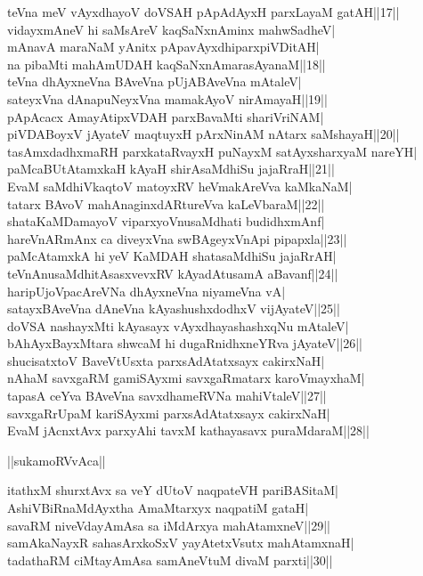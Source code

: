 \documentclass{article}
\begin{document}
teVna meV vAyxdhayoV doVSAH pApAdAyxH parxLayaM gatAH||17||\\
vidayxmAneV hi saMsAreV kaqSaNxnAminx mahwSadheV|\\
mAnavA maraNaM yAnitx pApavAyxdhiparxpiVDitAH|\\
na pibaMti mahAmUDAH kaqSaNxnAmarasAyanaM||18||\\
teVna dhAyxneVna BAveVna pUjABAveVna mAtaleV|\\
sateyxVna dAnapuNeyxVna mamakAyoV nirAmayaH||19||\\
pApAcacx AmayAtipxVDAH parxBavaMti shariVriNAM|\\
piVDABoyxV jAyateV maqtuyxH pArxNinAM nAtarx saMshayaH||20||\\
tasAmxdadhxmaRH parxkataRvayxH puNayxM satAyxsharxyaM nareYH|\\
paMcaBUtAtamxkaH kAyaH shirAsaMdhiSu jajaRraH||21||\\
EvaM saMdhiVkaqtoV matoyxRV heVmakAreVva kaMkaNaM|\\
tatarx BAvoV mahAnaginxdARtureVva kaLeVbaraM||22||\\
shataKaMDamayoV viparxyoVnusaMdhati budidhxmAnf|\\
hareVnARmAnx ca diveyxVna swBAgeyxVnApi pipapxla||23||\\
paMcAtamxkA hi yeV KaMDAH shatasaMdhiSu jajaRrAH|\\
teVnAnusaMdhitAsasxvevxRV kAyadAtusamA aBavanf||24||\\
haripUjoVpacAreVNa dhAyxneVna niyameVna vA|\\
satayxBAveVna dAneVna kAyashushxdodhxV vijAyateV||25||\\
doVSA nashayxMti kAyasayx vAyxdhayashashxqNu mAtaleV|\\
bAhAyxBayxMtara shwcaM hi dugaRnidhxneYRva jAyateV||26||\\
shucisatxtoV BaveVtUsxta parxsAdAtatxsayx cakirxNaH|\\
nAhaM savxgaRM gamiSAyxmi savxgaRmatarx karoVmayxhaM|\\
tapasA ceYva BAveVna savxdhameRVNa mahiVtaleV||27||\\
savxgaRrUpaM kariSAyxmi parxsAdAtatxsayx cakirxNaH|\\
EvaM jAcnxtAvx parxyAhi tavxM kathayasavx puraMdaraM||28||\\

\begin{center}
||sukamoRVvAca||
\end{center}

itathxM shurxtAvx sa veY dUtoV naqpateVH pariBASitaM|\\
AshiVBiRnaMdAyxtha AmaMtarxyx naqpatiM gataH|\\
savaRM niveVdayAmAsa sa iMdArxya mahAtamxneV||29||\\
samAkaNayxR sahasArxkoSxV yayAtetxVsutx mahAtamxnaH|\\
tadathaRM ciMtayAmAsa samAneVtuM divaM parxti||30||
\end{document}
